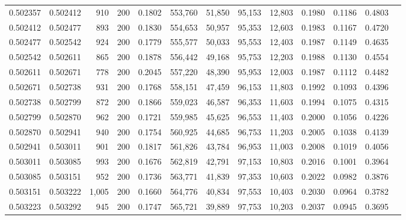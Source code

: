 \begin{tabular}{rrrrrrrrrrrrr}
0.502357 & 0.502412 &   910 & 200 &                                     0.1802 & 553,760 &  51,850 &  95,153 &  12,803 & 0.1980 & 0.1186 & 0.4803 \\
0.502412 & 0.502477 &   893 & 200 &                                     0.1830 & 554,653 &  50,957 &  95,353 &  12,603 & 0.1983 & 0.1167 & 0.4720 \\
0.502477 & 0.502542 &   924 & 200 &                                     0.1779 & 555,577 &  50,033 &  95,553 &  12,403 & 0.1987 & 0.1149 & 0.4635 \\
0.502542 & 0.502611 &   865 & 200 &                                     0.1878 & 556,442 &  49,168 &  95,753 &  12,203 & 0.1988 & 0.1130 & 0.4554 \\
0.502611 & 0.502671 &   778 & 200 &                                     0.2045 & 557,220 &  48,390 &  95,953 &  12,003 & 0.1987 & 0.1112 & 0.4482 \\
0.502671 & 0.502738 &   931 & 200 &                                     0.1768 & 558,151 &  47,459 &  96,153 &  11,803 & 0.1992 & 0.1093 & 0.4396 \\
0.502738 & 0.502799 &   872 & 200 &                                     0.1866 & 559,023 &  46,587 &  96,353 &  11,603 & 0.1994 & 0.1075 & 0.4315 \\
0.502799 & 0.502870 &   962 & 200 &                                     0.1721 & 559,985 &  45,625 &  96,553 &  11,403 & 0.2000 & 0.1056 & 0.4226 \\
0.502870 & 0.502941 &   940 & 200 &                                     0.1754 & 560,925 &  44,685 &  96,753 &  11,203 & 0.2005 & 0.1038 & 0.4139 \\
0.502941 & 0.503011 &   901 & 200 &                                     0.1817 & 561,826 &  43,784 &  96,953 &  11,003 & 0.2008 & 0.1019 & 0.4056 \\
0.503011 & 0.503085 &   993 & 200 &                                     0.1676 & 562,819 &  42,791 &  97,153 &  10,803 & 0.2016 & 0.1001 & 0.3964 \\
0.503085 & 0.503151 &   952 & 200 &                                     0.1736 & 563,771 &  41,839 &  97,353 &  10,603 & 0.2022 & 0.0982 & 0.3876 \\
0.503151 & 0.503222 & 1,005 & 200 &                                     0.1660 & 564,776 &  40,834 &  97,553 &  10,403 & 0.2030 & 0.0964 & 0.3782 \\
0.503223 & 0.503292 &   945 & 200 &                                     0.1747 & 565,721 &  39,889 &  97,753 &  10,203 & 0.2037 & 0.0945 & 0.3695 \\

\end{tabular}
